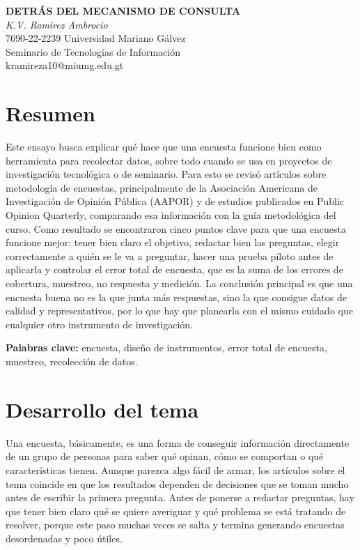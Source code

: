 \documentclass[12pt,letterpaper]{article}
\begin{document}
\begin{center}
{\bfseries DETRÁS DEL MECANISMO DE CONSULTA }\\[4pt]
\textit{K.V. Ramirez Ambrocio}\\
7690-22-2239 \quad Universidad Mariano Gálvez\\
Seminario de Tecnologías de Información\\
kramireza10@miumg.edu.gt
\end{center}

\vspace{6pt}

\section*{Resumen}
Este ensayo busca explicar qué hace que una encuesta funcione bien como herramienta para recolectar datos, sobre todo cuando se usa en proyectos de investigación tecnológica o de seminario. Para esto se revisó artículos sobre metodología de encuestas, principalmente de la Asociación Americana de Investigación de Opinión Pública (AAPOR) y de estudios publicados en Public Opinion Quarterly, comparando esa información con la guía metodológica del curso. Como resultado se encontraron cinco puntos clave para que una encuesta funcione mejor: tener bien claro el objetivo, redactar bien las preguntas, elegir correctamente a quién se le va a preguntar, hacer una prueba piloto antes de aplicarla y controlar el error total de encuesta, que es la suma de los errores de cobertura, muestreo, no respuesta y medición. La conclusión principal es que una encuesta buena no es la que junta más respuestas, sino la que consigue datos de calidad y representativos, por lo que hay que planearla con el mismo cuidado que cualquier otro instrumento de investigación.

\textbf{Palabras clave:} encuesta, diseño de instrumentos, error total de encuesta, muestreo, recolección de datos.

\section*{Desarrollo del tema}

Una encuesta, básicamente, es una forma de conseguir información directamente de un grupo de personas para saber qué opinan, cómo se comportan o qué características tienen. Aunque parezca algo fácil de armar, los artículos sobre el tema coincide en que los resultados dependen de decisiones que se toman mucho antes de escribir la primera pregunta. Antes de ponerse a redactar preguntas, hay que tener bien claro qué se quiere averiguar y qué problema se está tratando de resolver, porque este paso muchas veces se salta y termina generando encuestas desordenadas y poco útiles.
\end{document}
